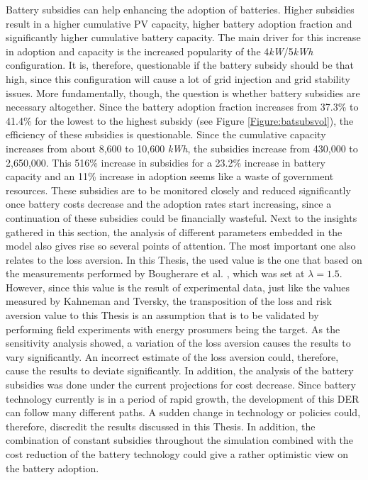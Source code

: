 Battery subsidies can help enhancing the adoption of batteries. Higher subsidies result in a higher cumulative PV capacity, higher battery adoption fraction and significantly higher cumulative battery capacity. The main driver for this increase in adoption and capacity is the increased popularity of the 4\textit{kW}/5\textit{kWh} configuration. It is, therefore, questionable if the battery subsidy should be that high, since this configuration will cause a lot of grid injection and grid stability issues. More fundamentally, though, the question is whether battery subsidies are necessary altogether. Since the battery adoption fraction increases from 37.3\% to 41.4\% for the lowest to the highest subsidy (see Figure \ref{Figure:batsubsvol}), the efficiency of these subsidies is questionable. Since the cumulative capacity increases from about 8,600 to 10,600 \textit{kWh}, the subsidies increase from \EUR{} 430,000 to \EUR{} 2,650,000. This 516\% increase in subsidies for a 23.2\% increase in battery capacity and an 11\% increase in adoption seems like a waste of government resources. These subsidies are to be monitored closely and reduced significantly once battery costs decrease and the adoption rates start increasing, since a continuation of these subsidies could be financially wasteful. 
\newline \newline \noindent
Next to the insights gathered in this section, the analysis of different parameters embedded in the model also gives rise so several points of attention. The most important one also relates to the loss aversion. In this Thesis, the used value is the one that based on the measurements performed by Bougherare et al. \cite{lossaversions}, which was set at $\lambda = 1.5$. However, since this value is the result of experimental data, just like the values measured by Kahneman and Tversky, the transposition of the loss and risk aversion value to this Thesis is an assumption that is to be validated by performing field experiments with energy prosumers being the target. As the sensitivity analysis showed, a variation of the loss aversion causes the results to vary significantly. An incorrect estimate of the loss aversion could, therefore, cause the results to deviate significantly. 
\newline \newline \noindent
In addition, the analysis of the battery subsidies was done under the current projections for cost decrease. Since battery technology currently is in a period of rapid growth, the development of this DER can follow many different paths. A sudden change in technology or policies could, therefore, discredit the results discussed in this Thesis. In addition, the combination of constant subsidies throughout the simulation combined with the cost reduction of the battery technology could give a rather optimistic view on the battery adoption.
